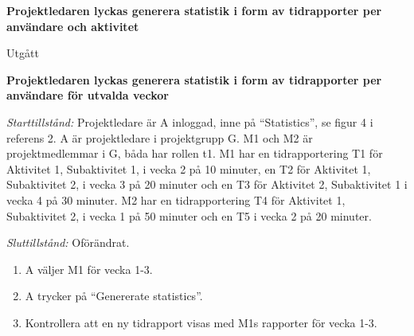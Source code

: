 \documentclass[a4paper]{article}
\begin{document}
\begin{FT}
\item
\textbf{Projektledaren lyckas generera statistik i form av tidrapporter per användare och aktivitet}

Utgått





\item
\textbf{Projektledaren lyckas generera statistik i form av tidrapporter per användare för utvalda veckor}

\emph{Starttillstånd:} Projektledare är A inloggad, inne på ``Statistics'', se figur 4 i referens 2. A är projektledare i projektgrupp G. M1 och M2 är projektmedlemmar i G, båda har rollen t1. M1 har en tidrapportering T1 för Aktivitet 1, Subaktivitet 1, i vecka 2 på 10 minuter, en T2 för Aktivitet 1, Subaktivitet 2, i vecka 3 på 20 minuter och en T3 för Aktivitet 2, Subaktivitet 1 i vecka 4 på 30 minuter. M2 har en tidrapportering T4 för Aktivitet 1, Subaktivitet 2, i vecka 1 på 50 minuter och en T5 i vecka 2 på 20 minuter.

\emph{Sluttillstånd:} Oförändrat.

\begin{enumerate}
\item A väljer M1 för vecka 1-3.
\item A trycker på ``Genererate statistics''.
\item Kontrollera att en ny tidrapport visas med M1s rapporter för vecka 1-3.
\end{enumerate}



\end{FT}
\end{document}
